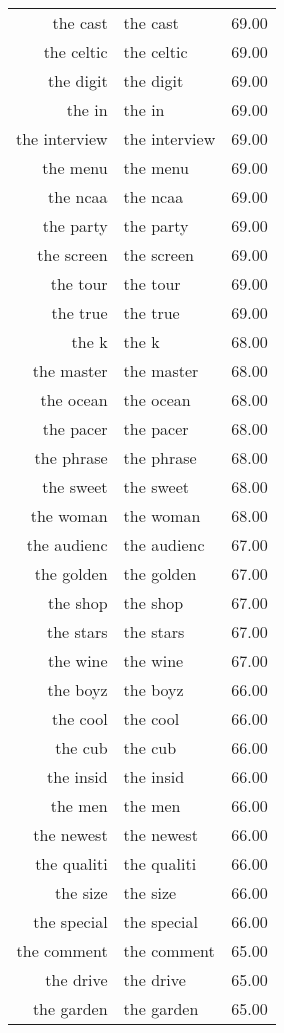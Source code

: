 \begin{table}[ht]
\begin{tabular}{rlr}
  the cast & the cast & 69.00 \\ 
  the celtic & the celtic & 69.00 \\ 
  the digit & the digit & 69.00 \\ 
  the in & the in & 69.00 \\ 
  the interview & the interview & 69.00 \\ 
  the menu & the menu & 69.00 \\ 
  the ncaa & the ncaa & 69.00 \\ 
  the party & the party & 69.00 \\ 
  the screen & the screen & 69.00 \\ 
  the tour & the tour & 69.00 \\ 
  the true & the true & 69.00 \\ 
  the k & the k & 68.00 \\ 
  the master & the master & 68.00 \\ 
  the ocean & the ocean & 68.00 \\ 
  the pacer & the pacer & 68.00 \\ 
  the phrase & the phrase & 68.00 \\ 
  the sweet & the sweet & 68.00 \\ 
  the woman & the woman & 68.00 \\ 
  the audienc & the audienc & 67.00 \\ 
  the golden & the golden & 67.00 \\ 
  the shop & the shop & 67.00 \\ 
  the stars & the stars & 67.00 \\ 
  the wine & the wine & 67.00 \\ 
  the boyz & the boyz & 66.00 \\ 
  the cool & the cool & 66.00 \\ 
  the cub & the cub & 66.00 \\ 
  the insid & the insid & 66.00 \\ 
  the men & the men & 66.00 \\ 
  the newest & the newest & 66.00 \\ 
  the qualiti & the qualiti & 66.00 \\ 
  the size & the size & 66.00 \\ 
  the special & the special & 66.00 \\ 
  the comment & the comment & 65.00 \\ 
  the drive & the drive & 65.00 \\ 
  the garden & the garden & 65.00 \\ 

\end{tabular}
\end{table}
